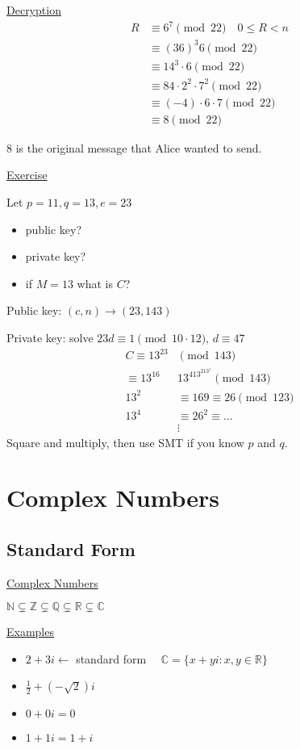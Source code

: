 \documentclass{article}
\begin{document}
\underline{Decryption}
\begin{align*}
    R &\equiv 6^7 \pmod{22} \quad{0 \le R < n}\\
    &\equiv (36)^3 6 \pmod{22}\\
    &\equiv 14^3 \cdot 6 \pmod{22}\\
    &\equiv 84 \cdot 2^2 \cdot 7^2 \pmod{22}\\
    &\equiv (-4) \cdot 6 \cdot 7 \pmod{22}\\
    &\equiv 8 \pmod{22}
\end{align*}

8 is the original message that Alice wanted to send.

\underline{Exercise}

Let $p=11, q=13, e = 23$
\begin{itemize}
    \item public key?
    \item private key?
    \item if $M=13$ what is $C$?
\end{itemize}

Public key: $(c,n) \to (23,143)$

Private key: solve $23d \equiv 1 \pmod{10 \cdot 12}$, $d \equiv 47$
\begin{align*}
    C \equiv 13^{23} &\pmod{143}\\
    \equiv 13^{16}&13^413^213^1 \pmod{143}\\
    13^2 &\equiv 169 \equiv 26 \pmod{123}\\
    13^4 &\equiv 26^2 \equiv \ldots \\
    &\vdots 
\end{align*}
Square and multiply, then use SMT if you know $p$ and $q$. 


\section{Complex Numbers}

\subsection{Standard Form}

\underline{Complex Numbers}

$\mathbb{N} \subsetneq \mathbb{Z} \subsetneq \mathbb{Q} \subsetneq \mathbb{R} \subsetneq \mathbb{C}$

\underline{Examples}

\begin{itemize}
    \item $2 + 3i \leftarrow$ standard form $\quad \mathbb{C} = \{x + yi: x,y \in \mathbb{R}\}$
    \item $\frac{1}{2} + (-\sqrt{2})i$
    \item $0 + 0i = 0$
    \item $1 + 1i = 1 + i$
\end{itemize}
\end{document}
